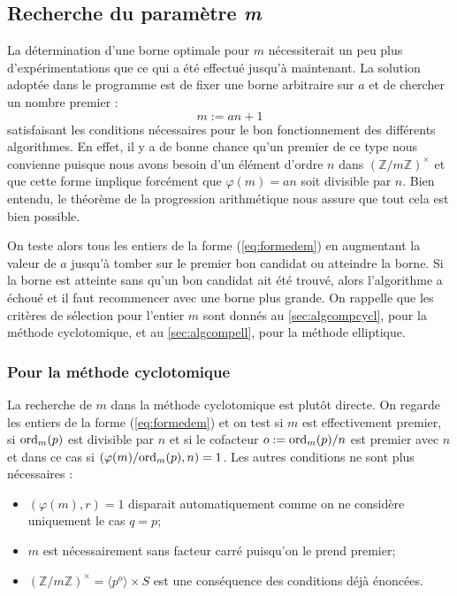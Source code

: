 \documentclass[a4paper]{article} %
\numberwithin{section}{part}
\numberwithin{equation}{section}
\newcommand\zmodninv[1]{(\mathbb{Z}/#1\mathbb{Z})^{\times}}
\newcommand\groupgen[1]{\langle{#1}\rangle}
\newcommand\ord[2]{\textup{ord}_{#1}(#2)}
\begin{document}
\subsection{Recherche du paramètre \emph{m}}
La détermination d'une borne optimale pour $m$ nécessiterait un peu plus
d'expérimentations que ce qui a été effectué jusqu'à maintenant. La solution 
adoptée dans le programme est de fixer une borne arbitraire sur $a$ et de 
chercher un nombre premier :
\begin{equation}
\label{eq:formedem}
m := an + 1 
\end{equation}
satisfaisant les conditions nécessaires pour le bon fonctionnement
des différents algorithmes. En effet, il y a de bonne chance qu'un premier de ce
type nous convienne puisque nous avons besoin d'un élément d'ordre $n$ dans
$\zmodninv{m}$ et que cette forme implique forcément que $\varphi(m) = 
an$ soit divisible par $n$. Bien entendu, le théorème de la progression
arithmétique nous assure que tout cela est bien possible.\par
On teste alors tous les entiers de la forme (\ref{eq:formedem}) en augmentant la
valeur de $a$ jusqu'à tomber sur le premier bon candidat ou atteindre la borne.
Si la borne est atteinte sans qu'un bon candidat ait été trouvé, alors 
l'algorithme a échoué et il faut recommencer avec une borne plus grande. On 
rappelle que les critères de sélection pour l'entier $m$ sont donnés au 
\ref{sec:algcompcycl}, pour la méthode cyclotomique, et au \ref{sec:algcompell},
pour la méthode elliptique.

\subsubsection*{Pour la méthode cyclotomique}
\label{sec:recherchemcycl}

La recherche de $m$ dans la méthode cyclotomique est plutôt directe. On regarde
les entiers de la forme (\ref{eq:formedem}) et on test si $m$ est effectivement
premier, si $\ord{m}{p}$ est divisible par $n$ et si le cofacteur
$o := \ord{m}{p}/n$ est premier avec $n$ et dans ce cas si 
$(\varphi(m)/\ord{m}{p}, n) = 1$. Les autres conditions ne sont plus 
nécessaires :
\vspace{0.3cm}
\begin{itemize}
    \item $(\varphi(m), r) = 1$ disparait automatiquement comme on
    ne considère uniquement le cas $q = p$;
    
    \item $m$ est nécessairement sans facteur carré puisqu'on le prend premier;

    \item $\zmodninv{m} = \groupgen{p^o}\times S$ est une conséquence des
    conditions déjà énoncées.
\end{itemize}
\vspace{0.3cm}
\end{document}
